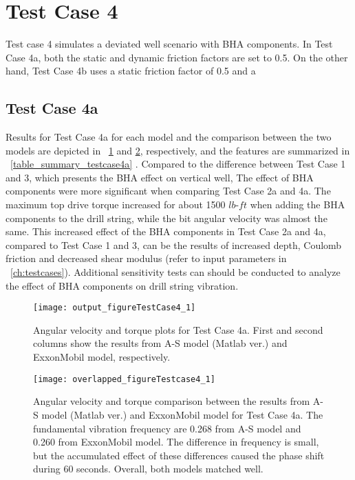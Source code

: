 \section{Test Case 4}
Test case 4 simulates a deviated well scenario with BHA components. In Test Case 4a, both the static and dynamic friction factors are set to 0.5. On the other hand, Test Case 4b uses a static friction factor of 0.5 and a 

\subsection{Test Case 4a}
Results for Test Case 4a for each model and the comparison between the two models are depicted in \figurename~\ref{figure_testcase4_1} and \ref{figure_testCase4_1_overlapped}, respectively, and the features are summarized in \tablename~\ref{table_summary_testcase4a} . Compared to the difference between Test Case 1 and 3, which presents the BHA effect on vertical well, The effect of BHA components were more significant when comparing Test Case 2a and 4a. The maximum top drive torque increased for about 1500 $lb\mbox{-}ft$ when adding the BHA components to the drill string, while the bit angular velocity was almost the same. This increased effect of the BHA components in Test Case 2a and 4a, compared to Test Case 1 and 3, can be the results of increased depth, Coulomb friction and decreased shear modulus (refer to input parameters in \chaptername~\ref{ch:testcases}). Additional sensitivity tests can should be conducted to analyze the effect of BHA components on drill string vibration.

\begin{figure}
  \centering
  \texttt{[image: output\_figureTestCase4\_1]}
  \caption[Angular velocity and torque plots for Test Case 4a]{Angular velocity and torque plots for Test Case 4a. First and second columns show the results from A-S model (Matlab ver.) and ExxonMobil model, respectively.}\label{figure_testcase4_1}
\end{figure}

\begin{figure}
  \centering
  \texttt{[image: overlapped\_figureTestcase4\_1]}
  \caption[Angular velocity and torque comparison plots for Test Case 4a]{Angular velocity and torque comparison between the results from A-S model (Matlab ver.) and ExxonMobil model for Test Case 4a. The fundamental vibration frequency are 0.268 from A-S model and 0.260 from ExxonMobil model. The difference in frequency is small, but the accumulated effect of these differences caused the phase shift during 60 seconds. Overall, both models matched well.}\label{figure_testCase4_1_overlapped}
\end{figure}

